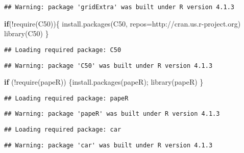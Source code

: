 \documentclass[
]{article}
\newenvironment{Shaded}{\begin{snugshade}}{\end{snugshade}}
\newcommand{\AttributeTok}[1]{\textcolor[rgb]{0.77,0.63,0.00}{#1}}
\newcommand{\ControlFlowTok}[1]{\textcolor[rgb]{0.13,0.29,0.53}{\textbf{#1}}}
\newcommand{\FunctionTok}[1]{\textcolor[rgb]{0.00,0.00,0.00}{#1}}
\newcommand{\NormalTok}[1]{#1}
\newcommand{\SpecialCharTok}[1]{\textcolor[rgb]{0.00,0.00,0.00}{#1}}
\newcommand{\StringTok}[1]{\textcolor[rgb]{0.31,0.60,0.02}{#1}}
\begin{document}
\begin{verbatim}
## Warning: package 'gridExtra' was built under R version 4.1.3
\end{verbatim}

\begin{Shaded}
\begin{Highlighting}[]
\ControlFlowTok{if}\NormalTok{(}\SpecialCharTok{!}\FunctionTok{require}\NormalTok{(C50))\{}
    \FunctionTok{install.packages}\NormalTok{(}\StringTok{\textquotesingle{}C50\textquotesingle{}}\NormalTok{, }\AttributeTok{repos=}\StringTok{\textquotesingle{}http://cran.us.r{-}project.org\textquotesingle{}}\NormalTok{)}
    \FunctionTok{library}\NormalTok{(C50)}
\NormalTok{\}}
\end{Highlighting}
\end{Shaded}

\begin{verbatim}
## Loading required package: C50
\end{verbatim}

\begin{verbatim}
## Warning: package 'C50' was built under R version 4.1.3
\end{verbatim}

\begin{Shaded}
\begin{Highlighting}[]
\ControlFlowTok{if}\NormalTok{ (}\SpecialCharTok{!}\FunctionTok{require}\NormalTok{(}\StringTok{\textquotesingle{}papeR\textquotesingle{}}\NormalTok{)) \{}\FunctionTok{install.packages}\NormalTok{(}\StringTok{\textquotesingle{}papeR\textquotesingle{}}\NormalTok{); }\FunctionTok{library}\NormalTok{(}\StringTok{\textquotesingle{}papeR\textquotesingle{}}\NormalTok{)}
\NormalTok{\}}
\end{Highlighting}
\end{Shaded}

\begin{verbatim}
## Loading required package: papeR
\end{verbatim}

\begin{verbatim}
## Warning: package 'papeR' was built under R version 4.1.3
\end{verbatim}

\begin{verbatim}
## Loading required package: car
\end{verbatim}

\begin{verbatim}
## Warning: package 'car' was built under R version 4.1.3
\end{verbatim}
\end{document}
